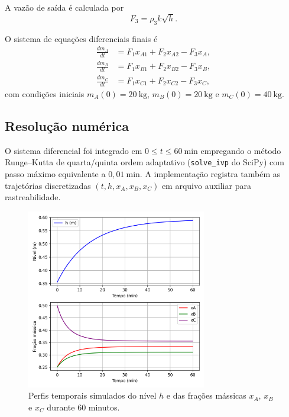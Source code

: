 \documentclass{article}
\begin{document}
A vazão de saída é calculada por
\begin{equation}
  F_3 = \rho_3 k \sqrt{h}. \label{eq:F3-q2}
\end{equation}

O sistema de equações diferenciais finais é
\begin{align}
  \frac{dm_A}{dt} &= F_1 x_{A1} + F_2 x_{A2} - F_3 x_A, \label{eq:balanco-A} \\
  \frac{dm_B}{dt} &= F_1 x_{B1} + F_2 x_{B2} - F_3 x_B, \label{eq:balanco-B} \\
  \frac{dm_C}{dt} &= F_1 x_{C1} + F_2 x_{C2} - F_3 x_C, \label{eq:balanco-C}
\end{align}
com condições iniciais $m_A(0) = 20\ \mathrm{kg}$, $m_B(0) = 20\ \mathrm{kg}$ e $m_C(0) = 40\ \mathrm{kg}$.

\subsection*{Resolução numérica}
O sistema diferencial foi integrado em $0 \leq t \leq 60\ \mathrm{min}$ empregando o método Runge--Kutta de quarta/quinta ordem adaptativo (\texttt{solve\_ivp} do SciPy) com passo máximo equivalente a $0{,}01\ \mathrm{min}$. A implementação registra também as trajetórias discretizadas $(t, h, x_A, x_B, x_C)$ em arquivo auxiliar para rastreabilidade.



\begin{figure}[ht]
  \centering
  \includegraphics[width=0.7\textwidth]{figuras/questao2_tanque.png}
  \caption{Perfis temporais simulados do nível $h$ e das frações mássicas $x_A$, $x_B$ e $x_C$ durante 60 minutos.}
  \label{fig:questao2}
\end{figure}
\end{document}
